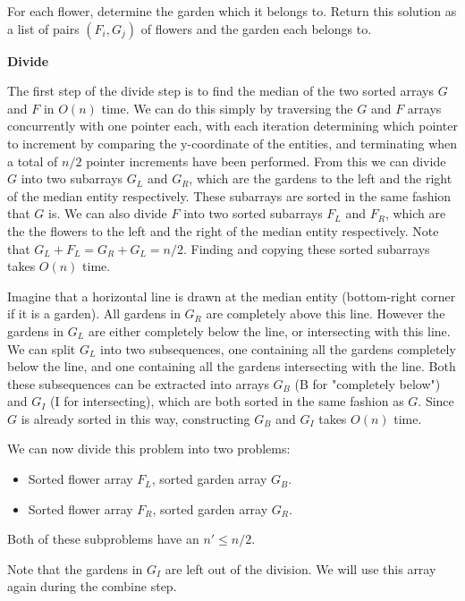 \documentclass{article}
\begin{document}
\begin{solution}
\begin{enumerate}[label = (\alph*)]
    For each flower, determine the garden which it belongs to.
    Return this solution as a list of pairs $(F_i, G_j)$ of flowers and the garden each belongs to.

    \pagebreak

    \textbf{Divide}

    The first step of the divide step is to find the median of the two sorted arrays $G$ and $F$ in $O(n)$ time.
    We can do this simply by traversing the $G$ and $F$ arrays concurrently with one pointer each, 
    with each iteration determining which pointer to increment by comparing the y-coordinate of the entities,
    and terminating when a total of $n/2$ pointer increments have been performed. 
    From this we can divide $G$ into two subarrays $G_L$ and $G_R$, which are the gardens to the 
    left and the right of the median entity respectively. These subarrays are sorted in the same fashion that $G$ is.
    We can also divide $F$ into two sorted subarrays $F_L$ and $F_R$, which are the the flowers to the left and the right of the median entity respectively.
    Note that $G_L + F_L = G_R + G_L = n/2$.
    Finding and copying these sorted subarrays takes $O(n)$ time.

    Imagine that a horizontal line is drawn at the median entity (bottom-right corner if it is a garden).
    All gardens in $G_R$ are completely above this line. However the gardens in $G_L$ are either completely below the line, or intersecting with this line.
    We can split $G_L$ into two subsequences, one containing all the gardens completely below the line, and one containing all the gardens intersecting with the line.
    Both these subsequences can be extracted into arrays $G_B$ (B for "completely below") and $G_I$ (I for intersecting), which are both sorted in the same fashion as $G$.
    Since $G$ is already sorted in this way, constructing $G_B$ and $G_I$ takes $O(n)$ time.

    We can now divide this problem into two problems:
    \begin{itemize}
        \item Sorted flower array $F_L$, sorted garden array $G_B$.
        \item Sorted flower array $F_R$, sorted garden array $G_R$.
    \end{itemize}
    Both of these subproblems have an $n'\leq n/2$.

    Note that the gardens in $G_I$ are left out of the division. We will use this array again during the combine step.


\end{enumerate}
\end{solution}
\end{document}
